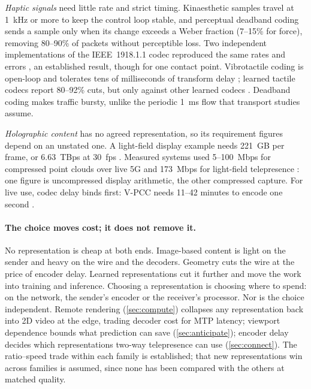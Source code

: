 \emph{Haptic signals} need little rate and strict timing. Kinaesthetic samples travel at 1~kHz or more to
keep the control loop stable, and perceptual deadband coding sends a sample only when its change exceeds
a Weber fraction (7--15\% for force), removing 80--90\% of packets without perceptible loss. Two
independent implementations of the IEEE~1918.1.1 codec reproduced the same rates and errors
\cite{W2912555763}, an established result, though for one contact point. Vibrotactile coding is
open-loop and tolerates tens of milliseconds of transform delay \cite{W2911218692}; learned tactile
codecs report 80--92\% cuts, but only against other learned codecs \cite{W7131889935}. Deadband coding
makes traffic bursty, unlike the periodic 1~ms flow that transport studies assume.

\emph{Holographic content} has no agreed representation, so its requirement figures depend on an unstated
one. A light-field display example needs 221~GB per frame, or 6.63~TBps at 30~fps
\cite{W4300960574}. Measured systems used 5--100~Mbps for compressed point clouds over live 5G
\cite{W4312662428} and 173~Mbps for light-field telepresence \cite{W3176472668}: one figure is
uncompressed display arithmetic, the other compressed capture. For live use, codec delay binds first:
V-PCC needs 11--42 minutes to encode one second \cite{W4309030584}.

\paragraph{The choice moves cost; it does not remove it.} No representation is cheap at both ends.
Image-based content is light on the sender and heavy on the wire and the decoders. Geometry cuts the wire
at the price of encoder delay. Learned representations cut it further and move the work into training
and inference. Choosing a representation is choosing where to spend: on the network, the
sender's encoder or the receiver's processor. Nor is the choice independent. Remote rendering
(\cref{sec:compute}) collapses any representation back into 2D video at the edge, trading decoder cost
for MTP latency; viewport dependence bounds what prediction can save (\cref{sec:anticipate}); encoder
delay decides which representations two-way telepresence can use (\cref{sec:connect}). The ratio--speed
trade within each family is established; that new representations win across families is assumed, since
none has been compared with the others at matched quality.

